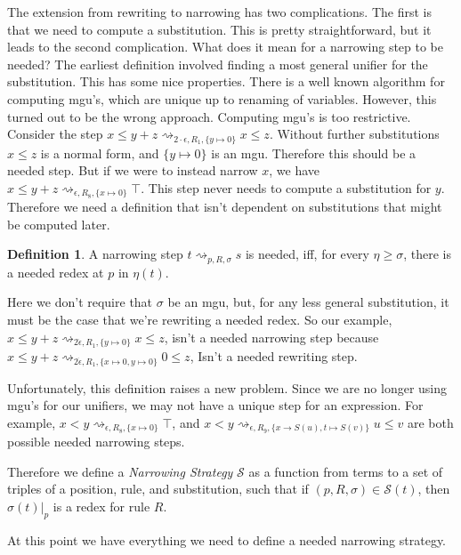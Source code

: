 \documentclass{book}
\theoremstyle{definition}
\newtheorem{definition}{Definition}[section]
\begin{document}
The extension from rewriting to narrowing has two complications.
The first is that we need to compute a substitution.  This is pretty straightforward,
but it leads to the second complication.
What does it mean for a narrowing step to be needed?
The earliest definition involved finding a most general unifier for the substitution.
This has some nice properties.
There is a well known algorithm for computing mgu's, which are unique up to renaming of variables.
However, this turned out to be the wrong approach.
Computing mgu's is too restrictive.
Consider the step $x \le y + z \rightsquigarrow_{2\cdot \epsilon,R_1,\{y \mapsto 0\}} x \le z$.  
Without further substitutions $x \le z$ is a normal form, and $\{y \mapsto 0\}$ is an mgu.
Therefore this should be a needed step.
But if we were to instead narrow $x$, we have $x \le y + z \rightsquigarrow_{\epsilon,R_8,\{x \mapsto 0\}} \top$.
This step never needs to compute a substitution for $y$.
Therefore we need a definition that isn't dependent on substitutions that might be computed later.


\theoremstyle{definition}
\begin{definition}
    A narrowing step $t \rightsquigarrow_{p, R, \sigma} s$ is needed, iff, for every $\eta \ge \sigma$,
    there is a needed redex at $p$ in $\eta(t)$.
\end{definition}

Here we don't require that $\sigma$ be an mgu, but, for any less general substitution,
it must be the case that we're rewriting a needed redex.
So our example, $x \le y + z \rightsquigarrow_{2\dot \epsilon,R_1,\{y \mapsto 0\}} x \le z$,
isn't a needed narrowing step because $x \le y + z \rightsquigarrow_{2\dot \epsilon,R_1,\{x \mapsto 0, y \mapsto 0\}} 0 \le z$,
Isn't a needed rewriting step.

Unfortunately, this definition raises a new problem.
Since we are no longer using mgu's for our unifiers, we may not have a unique step for an expression.
For example, $x < y \rightsquigarrow_{\epsilon, R_8, \{x\mapsto 0\}} \top $, and
$x < y \rightsquigarrow_{\epsilon, R_9, \{x\rightarrow S(u), t \mapsto S(v)\}} u \le v $
are both possible needed narrowing steps.

Therefore we define a \textit{Narrowing Strategy} $\mathcal{S}$ as a function from terms
to a set of triples of a position, rule, and substitution, such that if $(p, R, \sigma) \in \mathcal{S}(t)$,
then $\sigma(t)\vert_p$ is a redex for rule $R$.

At this point we have everything we need to define a needed narrowing strategy.
\end{document}
